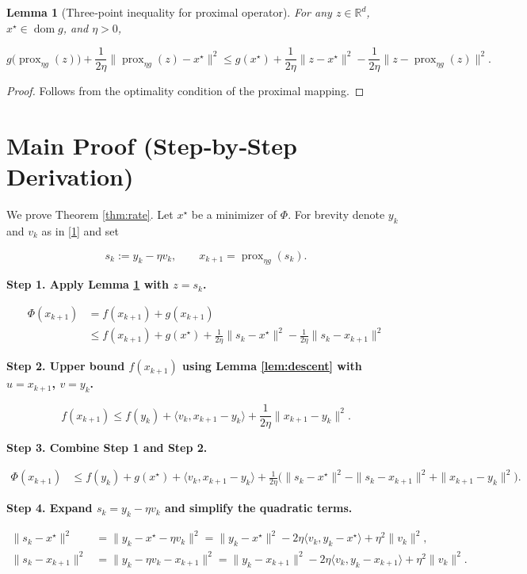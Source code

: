 \documentclass{article}
\newtheorem{lemma}{Lemma}
\newcommand{\prox}{\operatorname{prox}}
\begin{document}
\begin{lemma}[Three‑point inequality for proximal operator]\label{lem:prox}
For any $z\in\mathbb{R}^d$, $x^\star\in\operatorname{dom}g$, and $\eta>0$,

\[
g\bigl(\prox_{\eta g}(z)\bigr)+\frac{1}{2\eta}\bigl\|\prox_{\eta g}(z)-x^\star\bigr\|^{2}
\le g(x^\star)+\frac{1}{2\eta}\|z-x^\star\|^{2}
-\frac{1}{2\eta}\bigl\|z-\prox_{\eta g}(z)\bigr\|^{2}.
\tag{4}
\]
\end{lemma}
\begin{proof}
Follows from the optimality condition of the proximal mapping.
\end{proof}

\section*{Main Proof (Step‑by‑Step Derivation)}
We prove Theorem \ref{thm:rate}.  
Let $x^\star$ be a minimizer of $\Phi$.  
For brevity denote $y_k$ and $v_k$ as in \eqref{1} and set  

\[
s_k:=y_k-\eta v_k, \qquad x_{k+1}= \prox_{\eta g}(s_k).
\]

\noindent\textbf{Step 1.  Apply Lemma \ref{lem:prox} with $z=s_k$.}  

\[
\begin{aligned}
\Phi(x_{k+1})
&= f(x_{k+1})+g(x_{k+1})\\
&\le f(x_{k+1})+g(x^\star)+\frac{1}{2\eta}\|s_k-x^\star\|^{2}
-\frac{1}{2\eta}\|s_k-x_{k+1}\|^{2} \tag{Step 1}
\end{aligned}
\]

\noindent\textbf{Step 2.  Upper bound $f(x_{k+1})$ using Lemma \ref{lem:descent} with $u=x_{k+1}$, $v=y_k$.}  

\[
f(x_{k+1})\le f(y_k)+\langle v_k, x_{k+1}-y_k\rangle+\frac{1}{2\eta}\|x_{k+1}-y_k\|^{2}.
\tag{Step 2}
\]

\noindent\textbf{Step 3.  Combine Step 1 and Step 2.}  

\[
\begin{aligned}
\Phi(x_{k+1})
&\le f(y_k)+g(x^\star)+\langle v_k, x_{k+1}-y_k\rangle
      +\frac{1}{2\eta}\bigl(\|s_k-x^\star\|^{2}
      -\|s_k-x_{k+1}\|^{2}+\|x_{k+1}-y_k\|^{2}\bigr) .
\tag{Step 3}
\end{aligned}
\]

\noindent\textbf{Step 4.  Expand $s_k=y_k-\eta v_k$ and simplify the quadratic terms.}  

\[
\begin{aligned}
\|s_k-x^\star\|^{2}
&= \|y_k-x^\star-\eta v_k\|^{2}
 = \|y_k-x^\star\|^{2}-2\eta\langle v_k, y_k-x^\star\rangle+\eta^{2}\|v_k\|^{2},\\[4pt]
\|s_k-x_{k+1}\|^{2}
&= \|y_k-\eta v_k-x_{k+1}\|^{2}
 = \|y_k-x_{k+1}\|^{2}-2\eta\langle v_k, y_k-x_{k+1}\rangle+\eta^{2}\|v_k\|^{2}.
\end{aligned}
\tag{Step 4}
\]
\end{document}

